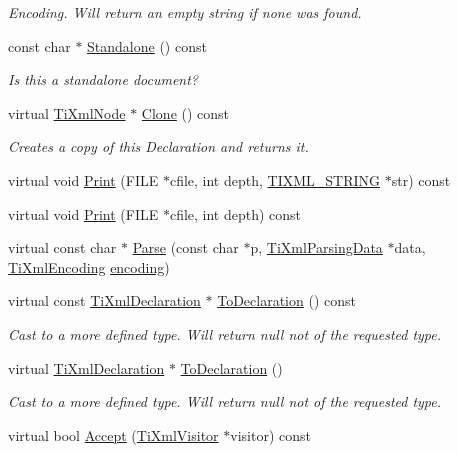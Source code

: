 \begin{DoxyCompactItemize}
\begin{DoxyCompactList}\small\item\em Encoding. Will return an empty string if none was found. \end{DoxyCompactList}\item 
const char $\ast$ \hyperlink{class_ti_xml_declaration_a1f2f8a741593d15a61e491e5024cacef}{Standalone} () const
\begin{DoxyCompactList}\small\item\em Is this a standalone document? \end{DoxyCompactList}\item 
virtual \hyperlink{class_ti_xml_node}{Ti\+Xml\+Node} $\ast$ \hyperlink{class_ti_xml_declaration_a35dc1455f69b79e81cae28e186944610}{Clone} () const
\begin{DoxyCompactList}\small\item\em Creates a copy of this Declaration and returns it. \end{DoxyCompactList}\item 
virtual void \hyperlink{class_ti_xml_declaration_ace687d02a5a25a060ae3802abb1b3f55}{Print} (F\+I\+LE $\ast$cfile, int depth, \hyperlink{tinyxml_8h_a92bada05fd84d9a0c9a5bbe53de26887}{T\+I\+X\+M\+L\+\_\+\+S\+T\+R\+I\+NG} $\ast$str) const
\item 
virtual void \hyperlink{class_ti_xml_declaration_ae46cff6565f299210ab945e78bf28514}{Print} (F\+I\+LE $\ast$cfile, int depth) const
\item 
virtual const char $\ast$ \hyperlink{class_ti_xml_declaration_a9839ea97ed687a2b7342fd7b0f04361b}{Parse} (const char $\ast$p, \hyperlink{class_ti_xml_parsing_data}{Ti\+Xml\+Parsing\+Data} $\ast$data, \hyperlink{tinyxml_8h_a88d51847a13ee0f4b4d320d03d2c4d96}{Ti\+Xml\+Encoding} \hyperlink{class_ti_xml_declaration_a24b8645d7696ec169bbb3fb7d30860cf}{encoding})
\item 
virtual const \hyperlink{class_ti_xml_declaration}{Ti\+Xml\+Declaration} $\ast$ \hyperlink{class_ti_xml_declaration_aab62703b620d9b9391b482dc1835ecf6}{To\+Declaration} () const
\begin{DoxyCompactList}\small\item\em Cast to a more defined type. Will return null not of the requested type. \end{DoxyCompactList}\item 
virtual \hyperlink{class_ti_xml_declaration}{Ti\+Xml\+Declaration} $\ast$ \hyperlink{class_ti_xml_declaration_a6bd3d1daddcaeb9543c24bfd090969ce}{To\+Declaration} ()
\begin{DoxyCompactList}\small\item\em Cast to a more defined type. Will return null not of the requested type. \end{DoxyCompactList}\item 
virtual bool \hyperlink{class_ti_xml_declaration_aa1b6bade6c989407ce9881bdfc73c1e6}{Accept} (\hyperlink{class_ti_xml_visitor}{Ti\+Xml\+Visitor} $\ast$visitor) const
\end{DoxyCompactItemize}
